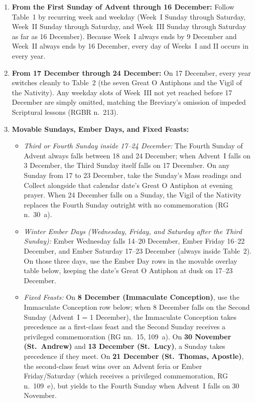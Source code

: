 \begin{enumerate}
\item \textbf{From the First Sunday of Advent through 16 December:} Follow
Table~1 by recurring week and weekday (Week~I Sunday through Saturday, Week~II
Sunday through Saturday, and Week~III Sunday through Saturday as far as 16
December). Because Week~I always ends by 9 December and Week~II always ends by
16 December, every day of Weeks~I and II occurs in every year.
\item \textbf{From 17 December through 24 December:} On 17 December, every year
switches cleanly to Table~2 (the seven Great O Antiphons and the Vigil of the
Nativity). Any weekday slots of Week~III not yet reached before 17 December are
simply omitted, matching the Breviary's omission of impeded Scriptural lessons
(RGBR n.~213).
\item \textbf{Movable Sundays, Ember Days, and Fixed Feasts:}
\begin{itemize}
\item \textit{Third or Fourth Sunday inside 17--24 December:} The Fourth Sunday
of Advent always falls between 18 and 24 December; when Advent~I falls on
3 December, the Third Sunday itself falls on 17 December. On any Sunday from
17 to 23 December, take the Sunday's Mass readings and Collect alongside that
calendar date's Great O Antiphon at evening prayer. When 24 December falls on a
Sunday, the Vigil of the Nativity replaces the Fourth Sunday outright with no
commemoration (RG n.~30~a).
\item \textit{Winter Ember Days (Wednesday, Friday, and Saturday after the Third
Sunday):} Ember Wednesday falls 14--20 December, Ember Friday 16--22 December,
and Ember Saturday 17--23 December (always inside Table~2). On those three
days, use the Ember Day rows in the movable overlay table below, keeping the
date's Great O Antiphon at dusk on 17--23 December.
\item \textit{Fixed Feasts:} On \textbf{8 December (Immaculate Conception)},
use the Immaculate Conception row below; when 8 December falls on the Second
Sunday (Advent~I = 1 December), the Immaculate Conception takes precedence as a
first-class feast and the Second Sunday receives a privileged commemoration
(RG nn.~15, 109~a). On \textbf{30 November (St.~Andrew)} and \textbf{13
December (St.~Lucy)}, a Sunday takes precedence if they meet. On \textbf{21
December (St.~Thomas, Apostle)}, the second-class feast wins over an Advent
feria or Ember Friday/Saturday (which receives a privileged commemoration, RG
n.~109~e), but yields to the Fourth Sunday when Advent~I falls on 30 November.
\end{itemize}
\end{enumerate}

